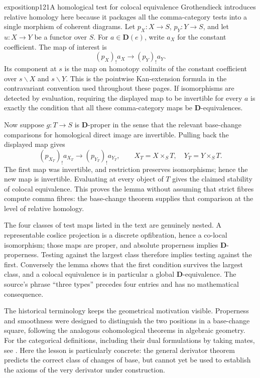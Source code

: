 \begin{dcomment}{exposition}{p121}{A homological test for colocal equivalence}
Grothendieck introduces relative homology here because it packages all the comma-category tests into a single morphism of coherent diagrams. Let $p_X:X\to S$, $p_Y:Y\to S$, and let $u:X\to Y$ be a functor over $S$. For $a\in\mathbf D(e)$, write $a_X$ for the constant coefficient. The map of interest is
\[
 (p_X)_!a_X\longrightarrow(p_Y)_!a_Y.
\]
Its component at $s$ is the map on homotopy colimits of the constant coefficient over $s\backslash X$ and $s\backslash Y$. This is the pointwise Kan-extension formula in the contravariant convention used throughout these pages. If isomorphisms are detected by evaluation, requiring the displayed map to be invertible for every $a$ is exactly the condition that all these comma-category maps be $\mathbf D$-equivalences.

Now suppose $g:T\to S$ is $\mathbf D$-proper in the sense that the relevant base-change comparisons for homological direct image are invertible. Pulling back the displayed map gives
\[
 (p_{X_T})_!a_{X_T}\longrightarrow(p_{Y_T})_!a_{Y_T},
 \qquad X_T=X\times_S T,\quad Y_T=Y\times_S T.
\]
The first map was invertible, and restriction preserves isomorphisms; hence the new map is invertible. Evaluating at every object of $T$ gives the claimed stability of colocal equivalence. This proves the lemma without assuming that strict fibres compute comma fibres: the base-change theorem supplies that comparison at the level of relative homology.

The four classes of test maps listed in the text are genuinely nested. A representable coslice projection is a discrete opfibration, hence a co-local isomorphism; those maps are proper, and absolute properness implies $\mathbf D$-properness. Testing against the largest class therefore implies testing against the first. Conversely the lemma shows that the first condition survives the largest class, and a colocal equivalence is in particular a global $\mathbf D$-equivalence. The source's phrase ``three types'' precedes four entries and has no mathematical consequence.

The historical terminology keeps the geometrical motivation visible. Properness and smoothness were designed to distinguish the two positions in a base-change square, following the analogous cohomological theorems in algebraic geometry. For the categorical definitions, including their dual formulations by taking mates, see \citet[Definition~1.1]{Maltsiniotis2005Asphericite}. Here the lesson is particularly concrete: the general derivator theorem predicts the correct class of changes of base, but cannot yet be used to establish the axioms of the very derivator under construction.
\end{dcomment}

